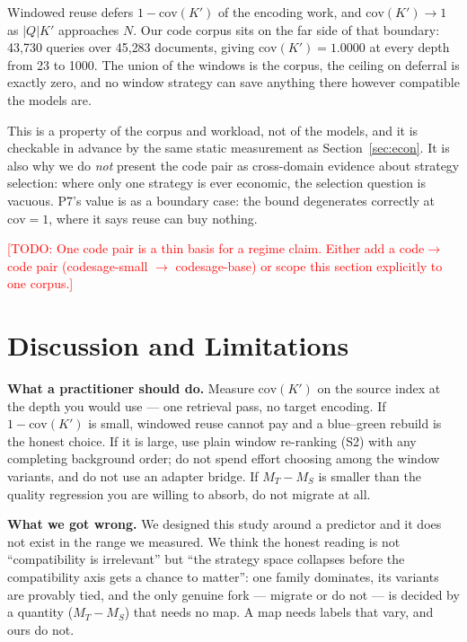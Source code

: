 \documentclass[conference]{IEEEtran}
\newcommand{\todo}[1]{\textcolor{red}{[TODO: #1]}}
\newcommand{\cov}{\mathrm{cov}}
\begin{document}
Windowed reuse defers $1 - \cov(K')$ of the encoding work, and
$\cov(K') \to 1$ as $\lvert Q\rvert K'$ approaches $N$. Our code corpus sits on the far
side of that boundary: 43{,}730 queries over 45{,}283 documents, giving
$\cov(K') = 1.0000$ at every depth from 23 to 1000. The union of the windows is the
corpus, the ceiling on deferral is exactly zero, and no window strategy can save anything
there however compatible the models are.

This is a property of the corpus and workload, not of the models, and it is checkable in
advance by the same static measurement as Section~\ref{sec:econ}. It is also why we do
\emph{not} present the code pair as cross-domain evidence about strategy selection: where
only one strategy is ever economic, the selection question is vacuous. P7's value is as a
boundary case: the bound degenerates correctly at $\cov = 1$, where it says reuse can buy
nothing.

\todo{One code pair is a thin basis for a regime claim. Either add a code$\to$code pair
(codesage-small $\to$ codesage-base) or scope this section explicitly to one corpus.}

\section{Discussion and Limitations}\label{sec:disc}

\textbf{What a practitioner should do.} Measure $\cov(K')$ on the source index at the
depth you would use --- one retrieval pass, no target encoding. If
$1 - \cov(K')$ is small, windowed reuse cannot pay and a blue--green rebuild is the
honest choice. If it is large, use plain window re-ranking (S2) with any completing
background order; do not spend effort choosing among the window variants, and do not use
an adapter bridge. If $M_T - M_S$ is smaller than the quality regression you are willing
to absorb, do not migrate at all.

\textbf{What we got wrong.} We designed this study around a predictor and it does not
exist in the range we measured. We think the honest reading is not ``compatibility is
irrelevant'' but ``the strategy space collapses before the compatibility axis gets a
chance to matter'': one family dominates, its variants are provably tied, and the only
genuine fork --- migrate or do not --- is decided by a quantity ($M_T - M_S$) that needs
no map. A map needs labels that vary, and ours do not.
\end{document}
